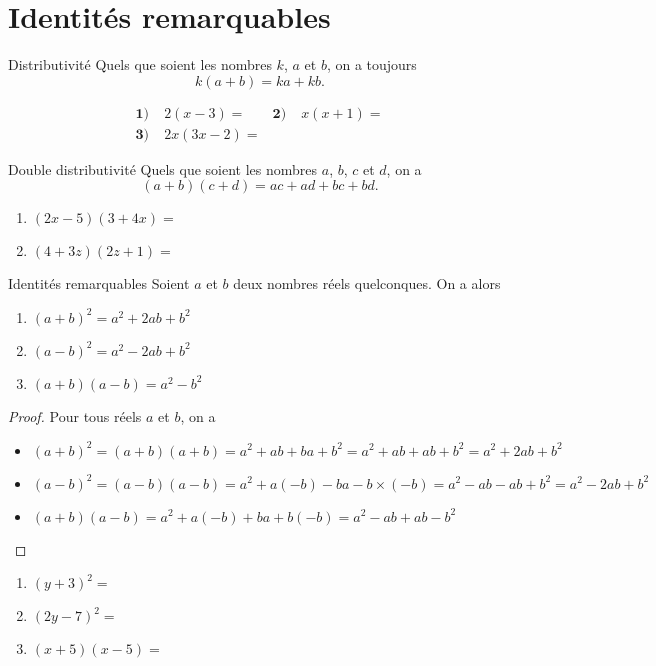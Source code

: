 \documentclass[11pt]{article}
\begin{document}
\section{Identités remarquables}
\begin{propnom}{Distributivité}
  Quels que soient les nombres $k$, $a$ et $b$, on a toujours
  \[
    k(a+b) = ka+kb.
  \]
\end{propnom}
\begin{app}
  \begin{align*}
    \textbf{1)}\;& 2(x-3) = &
    \textbf{2)}\;& x(x+1) = \\
    \textbf{3)}\;& 2x(3x-2) =
  \end{align*}
\end{app}
\begin{propnom}{Double distributivité}
  Quels que soient les nombres $a$, $b$, $c$ et $d$, on a
  \[
    (a+b)(c+d) = ac+ad+bc+bd.
  \]
\end{propnom}
\begin{app}
  \begin{enumerate}
    \item $(2x-5)(3+4x) = $
    \item $(4+3z)(2z+1) = $
  \end{enumerate}
\end{app}
\begin{propnom}{Identités remarquables}
  Soient $a$ et $b$ deux nombres réels quelconques. On a alors
  \begin{enumerate}
    \item $(a+b)^2 = a^2+2ab+b^2$
    \item $(a-b)^2 = a^2-2ab+b^2$
    \item $(a+b)(a-b) = a^2-b^2$
  \end{enumerate}
\end{propnom}
\begin{proof}
  Pour tous réels $a$ et $b$, on a 
  \begin{itemize}
    \item $(a+b)^2=(a+b)(a+b)=a^2+ab+ba+b^2= a^2+ab+ab+b^2=a^2+2ab+b^2$
    \item $(a-b)^2=(a-b)(a-b)=a^2+a(-b)-ba-b\times(-b)= a^2-ab-ab+b^2=a^2-2ab+b^2$
    \item $(a+b)(a-b)=a^2+a(-b)+ba+b(-b)=a^2-ab+ab-b^2$
  \end{itemize}
\end{proof}
\begin{app}
  \begin{enumerate}
    \item $(y+3)^2 = $
    \item $(2y-7)^2 = $
    \item $(x+5)(x-5) =$
  \end{enumerate}
\end{app}
\end{document}
